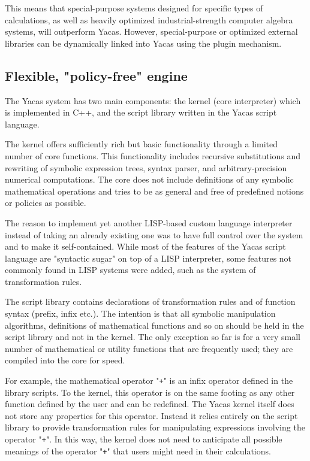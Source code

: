 \documentclass{llncs}
\begin{document}
This means that special-purpose systems designed for specific types of
calculations, as well as heavily optimized industrial-strength computer algebra
systems, will outperform Yacas. However, special-purpose or optimized external
libraries can be dynamically linked into Yacas using the plugin mechanism.


\subsection*{Flexible, "policy-free" engine}
The Yacas system has two main components: the kernel (core interpreter) which
is implemented in C++, and the script library written  in the Yacas script
language.


The kernel offers sufficiently rich but basic
functionality through a limited number of core functions. This functionality
includes recursive substitutions and rewriting of symbolic expression trees,
syntax parser, and arbitrary-precision numerical computations. The core does
not include definitions of any symbolic mathematical operations and tries to be
as general and free of predefined notions or policies as possible.


The reason to implement yet another LISP-based custom language interpreter
instead of taking an already existing one was to have full control over the
system and to make it self-contained.
While most of the features of the Yacas script language are "syntactic sugar" on top of a LISP 
interpreter, some features not commonly found in LISP systems were  added, such
as the system of transformation rules.


The script library contains declarations of transformation rules and of function
syntax (prefix, infix etc.). The intention is that all symbolic manipulation algorithms, definitions
of mathematical functions and so on should be held in the script library and not in the kernel. The
only exception so far is for a very small number of mathematical or utility
functions that are frequently used; they are compiled into the core for speed.


For example, the mathematical operator "\texttt{+}" is an infix operator defined in the
library scripts. To the kernel, this operator is on the same footing as any
other function defined by the user and can be redefined. The Yacas kernel
itself does not store any properties for this operator. Instead it relies
entirely on the script library to provide transformation rules for manipulating
expressions involving the operator "\texttt{+}". In this way, the kernel does not need
to anticipate all possible meanings of the operator "\texttt{+}" that users might need
in their calculations.
\end{document}
